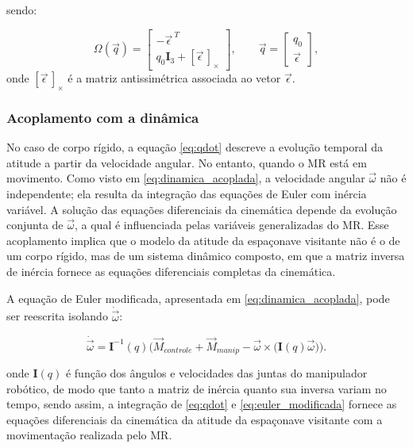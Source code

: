 sendo:

\begin{equation}
\Omega(\vec{q}) =
\begin{bmatrix}
-{\vec \epsilon\,}^T \\
q_0 \mathbf{I}_3 + [\vec \epsilon\,]_\times
\end{bmatrix},
\qquad
\vec{q} = \begin{bmatrix} q_0 \\
\vec{\epsilon} \end{bmatrix},
\end{equation}
onde $[\vec \epsilon\,]_\times$ é a matriz antissimétrica associada ao vetor $\vec \epsilon$.

\subsubsection{Acoplamento com a dinâmica}

No caso de corpo rígido, a equação \eqref{eq:qdot} descreve a evolução temporal da atitude a partir da velocidade angular. 
No entanto, quando o MR está em movimento.
Como visto em \eqref{eq:dinamica_acoplada}, a velocidade angular $\vec{\omega}$ não é independente; ela resulta da integração das equações de Euler com inércia variável.
A solução das equações diferenciais da cinemática depende da evolução conjunta de $\vec{\omega}$, a qual é influenciada pelas variáveis generalizadas do MR.
Esse acoplamento implica que o modelo da atitude da espaçonave visitante não é o de um corpo rígido, mas de um sistema dinâmico composto, em que a matriz inversa de inércia fornece as equações diferenciais completas da cinemática.

A equação de Euler modificada, apresentada em \eqref{eq:dinamica_acoplada}, pode ser reescrita isolando $\dot{\vec{\omega}}$:

\begin{equation}
\label{eq:euler_modificada}
\dot{\vec{\omega}}
= \mathbf{I}^{-1}(q)\Big(\vec{M}_{controle} + \vec{M}_{manip} - \vec{\omega} \times \big(\mathbf{I}(q)\vec{\omega}\big)\Big).
\end{equation}

onde $\mathbf{I}(q)$ é função dos ângulos e velocidades das juntas do manipulador robótico, de modo que tanto a matriz de inércia quanto sua inversa variam no tempo, sendo assim, a integração de \eqref{eq:qdot} e \eqref{eq:euler_modificada} fornece as equações diferenciais da cinemática da atitude da espaçonave visitante com a movimentação realizada pelo MR.

